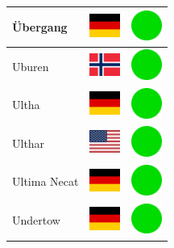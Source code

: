 \documentclass[12pt, a4paper, twoside]{report}
\begin{document}
\begin{center}
\begin{longtable}{|p{5cm}|p{2cm}|p{2cm}|}
 Übergang                                                   & \includegraphics[width=1cm]{../4x3/de} &   \includegraphics[width=1cm]{../likes/y} \\ \hline
 Uburen                                                     & \includegraphics[width=1cm]{../4x3/no} &   \includegraphics[width=1cm]{../likes/y} \\ \hline
 Ultha                                                      & \includegraphics[width=1cm]{../4x3/de} &   \includegraphics[width=1cm]{../likes/y} \\ \hline
 Ulthar                                                     & \includegraphics[width=1cm]{../4x3/us} &   \includegraphics[width=1cm]{../likes/y} \\ \hline
 Ultima Necat                                               & \includegraphics[width=1cm]{../4x3/de} &   \includegraphics[width=1cm]{../likes/y} \\ \hline
 Undertow                                                   & \includegraphics[width=1cm]{../4x3/de} &   \includegraphics[width=1cm]{../likes/y} \\ \hline

\end{longtable}
\end{center}
\end{document}
